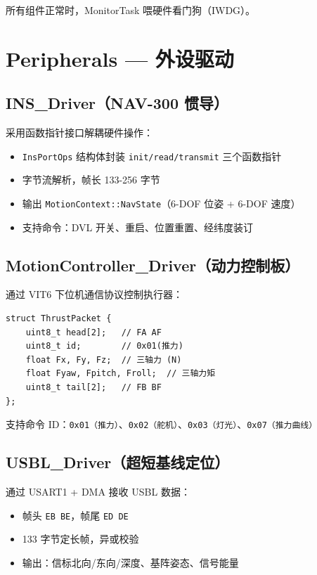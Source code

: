 \documentclass[12pt,a4paper]{article}
\begin{document}
所有组件正常时，MonitorTask 喂硬件看门狗（IWDG）。

\section{Peripherals — 外设驱动}

\subsection{INS\_Driver（NAV-300 惯导）}

采用函数指针接口解耦硬件操作：

\begin{itemize}
    \item \texttt{InsPortOps} 结构体封装 \texttt{init/read/transmit} 三个函数指针
    \item 字节流解析，帧长 133-256 字节
    \item 输出 \texttt{MotionContext::NavState}（6-DOF 位姿 + 6-DOF 速度）
    \item 支持命令：DVL 开关、重启、位置重置、经纬度装订
\end{itemize}

\subsection{MotionController\_Driver（动力控制板）}

通过 VIT6 下位机通信协议控制执行器：

\begin{lstlisting}[caption={协议数据包格式}]
struct ThrustPacket {
    uint8_t head[2];   // FA AF
    uint8_t id;        // 0x01(推力)
    float Fx, Fy, Fz;  // 三轴力 (N)
    float Fyaw, Fpitch, Froll;  // 三轴力矩
    uint8_t tail[2];   // FB BF
};
\end{lstlisting}

支持命令 ID：\texttt{0x01（推力）}、\texttt{0x02（舵机）}、\texttt{0x03（灯光）}、\texttt{0x07（推力曲线）}

\subsection{USBL\_Driver（超短基线定位）}

通过 USART1 + DMA 接收 USBL 数据：
\begin{itemize}
    \item 帧头 \texttt{EB BE}，帧尾 \texttt{ED DE}
    \item 133 字节定长帧，异或校验
    \item 输出：信标北向/东向/深度、基阵姿态、信号能量
\end{itemize}
\end{document}
